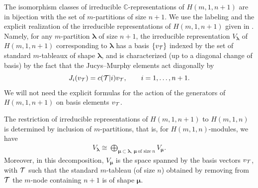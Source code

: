 \documentclass[pdftex]{sigma}
\newcommand{\lam}{\boldsymbol{\lambda}}
\newcommand{\mum}{\boldsymbol{\mu}}
\begin{document}
The isomorphism classes of irreducible $\mathbb{C}$-representations of $H(m,1,n+1)$ are in bijection with the set of $m$-partitions of size $n+1$.
We use the labeling and the explicit realization of the irreducible representations of $H(m,1,n+1)$ given in \cite{AK}. Namely, for any $m$-partition $\lam$ of size $n+1$, the irreducible representation $V_{\lam}$ of $H(m,1,n+1)$ corresponding to $\lam$ has a basis $\{v_{{\cal{T}}}\}$ indexed by the set of standard $m$-tableaux of shape $\lam$, and is characterized (up to a diagonal change of basis) by the fact that the Jucys--Murphy elements act diagonally by
\[
J_i(v_{{\cal{T}}})=c({\cal{T}}|i) v_{{\cal{T}}}  ,\qquad  i=1,\dots,n+1.
\]
We will not need the explicit formulas for the action of the generators of $H(m,1,n+1)$ on basis elements $v_{{\cal{T}}}$.

The restriction of irreducible  representations of $H(m,1,n+1)$ to $H(m,1,n)$ is determined
by inclusion of $m$-partitions, that is, for $H(m,1,n)$-modules, we have
\begin{gather}\label{Res}
V_{\lam}\cong\bigoplus_{\mum\subset\lam ,\ \mum\ \text{of size}\ n} V_{\mum}  .
\end{gather}
Moreover, in this decomposition, $V_{\mum}$ is the space spanned by the basis vectors $v_{{\cal{T}}}$, with ${\cal{T}}$ such that the standard $m$-tableau (of size $n$) obtained by removing from ${\cal{T}}$ the $m$-node containing $n+1$  is of shape $\mum$.
\end{document}
